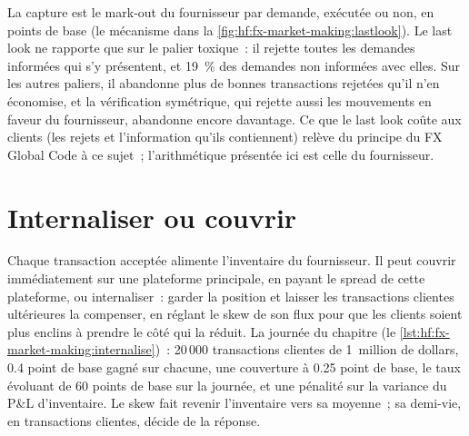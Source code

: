 La capture est le mark-out du fournisseur par demande, exécutée ou non, en points de base (le mécanisme dans la
\cref{fig:hf:fx-market-making:lastlook}). Le last look ne rapporte que sur le palier toxique~: il rejette toutes les demandes informées
qui s'y présentent, et 19~\% des demandes non informées avec elles. Sur les autres paliers, il abandonne plus de bonnes transactions rejetées qu'il n'en économise, et la vérification
symétrique, qui rejette aussi les mouvements en faveur du fournisseur, abandonne encore davantage. Ce que le last look coûte aux clients (les rejets et
l'information qu'ils contiennent) relève du principe du FX Global Code à ce sujet~; l'arithmétique présentée ici est celle du fournisseur.

\section{Internaliser ou couvrir}

Chaque transaction acceptée alimente l'inventaire du fournisseur. Il peut couvrir immédiatement sur une plateforme principale, en payant le spread de cette plateforme, ou internaliser~: garder la
position et laisser les transactions clientes ultérieures la compenser, en réglant le skew de son flux pour que les clients soient plus enclins à prendre le côté qui la réduit. La
journée du chapitre (le \cref{lst:hf:fx-market-making:internalise})~: 20\,000 transactions clientes de 1~million de dollars, 0.4 point de base gagné sur chacune, une couverture à 0.25
point de base, le taux évoluant de 60 points de base sur la journée, et une pénalité sur la variance du P\&L d'inventaire. Le skew fait revenir l'inventaire
vers sa moyenne~; sa demi-vie, en transactions clientes, décide de la réponse.

